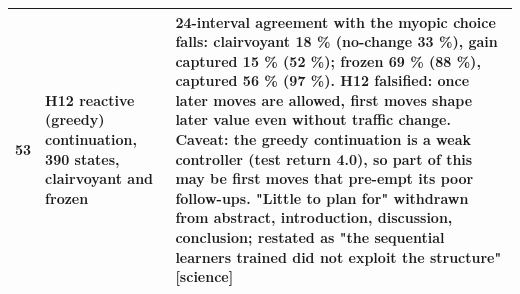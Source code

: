 {\begin{longtable}{@{}rp{}p{}@{}}
53 & \textbf{H12} reactive (greedy) continuation, 390 states, clairvoyant and frozen & 24-interval agreement with the myopic choice \textbf{falls}: clairvoyant 18 \% (no-change 33 \%), gain captured 15 \% (52 \%); frozen 69 \% (88 \%), captured 56 \% (97 \%). \textbf{H12 falsified}: once later moves are allowed, first moves shape later value even without traffic change. Caveat: the greedy continuation is a weak controller (test return 4.0), so part of this may be first moves that pre-empt its poor follow-ups. "Little to plan for" withdrawn from abstract, introduction, discussion, conclusion; restated as "the sequential learners trained did not exploit the structure" [science] \\
\bottomrule\end{longtable}}
